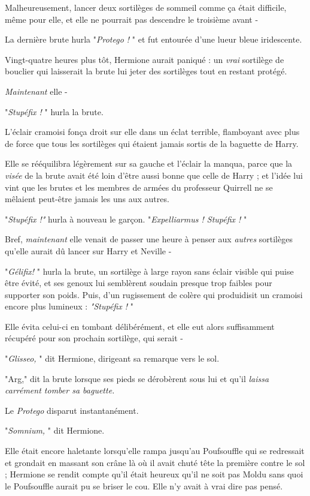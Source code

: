 Malheureusement, lancer deux sortilèges de sommeil comme ça était difficile, même pour elle, et elle ne pourrait pas descendre le troisième avant -

La dernière brute hurla "\emph{Protego !} " et fut entourée d'une lueur bleue iridescente.

Vingt-quatre heures plus tôt, Hermione aurait paniqué : un \emph{vrai}  sortilège de bouclier qui laisserait la brute lui jeter des sortilèges tout en restant protégé.

\emph{Maintenant}  elle -

"\emph{Stupéfix !} " hurla la brute.

L'éclair cramoisi fonça droit sur elle dans un éclat terrible, flamboyant avec plus de force que tous les sortilèges qui étaient jamais sortis de la baguette de Harry.

Elle se rééquilibra légèrement sur sa gauche et l'éclair la manqua, parce que la \emph{visée}  de la brute avait été loin d'être aussi bonne que celle de Harry ; et l'idée lui vint que les brutes et les membres de armées du professeur Quirrell ne se mêlaient peut-être jamais les uns aux autres.

"\emph{Stupéfix !" } hurla à nouveau le garçon. "\emph{Expelliarmus ! Stupéfix !} "

Bref, \emph{maintenant}  elle venait de passer une heure à penser aux \emph{autres}  sortilèges qu'elle aurait dû lancer sur Harry et Neville -

"\emph{Gélifix!} " hurla la brute, un sortilège à large rayon sans éclair visible qui puise être évité, et ses genoux lui semblèrent soudain presque trop faibles pour supporter son poids. Puis, d'un rugissement de colère qui produidisit un cramoisi encore plus lumineux : \emph{"Stupéfix !} "

Elle évita celui-ci en tombant délibérément, et elle eut alors suffisamment récupéré pour son prochain sortilège, qui serait -

"\emph{Glisseo,} " dit Hermione, dirigeant sa remarque vers le sol.

"Arg," dit la brute lorsque ses pieds se dérobèrent sous lui et qu'il \emph{laissa carrément tomber sa baguette.} 

Le \emph{Protego}  disparut instantanément.

"\emph{Somnium,} " dit Hermione.

Elle était encore haletante lorsqu'elle rampa jusqu'au Poufsouffle qui se redressait et grondait en massant son crâne là où il avait chuté tête la première contre le sol ; Hermione se rendit compte qu'il était heureux qu'il ne soit pas Moldu sans quoi le Poufsouffle aurait pu se briser le cou. Elle n'y avait à vrai dire pas pensé.

